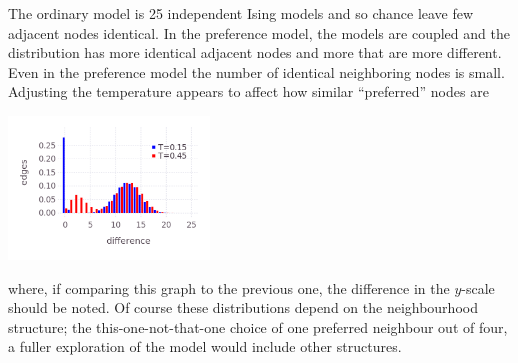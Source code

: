 \documentclass[letterpaper]{article}
\begin{document}
The ordinary model is 25 independent Ising models and so chance leave few adjacent nodes identical. In the preference model, the models are coupled and the distribution has more identical adjacent nodes and more that are more different. Even in the preference model the number of identical neighboring nodes is small. Adjusting the temperature appears to affect how similar ``preferred'' nodes are
\begin{center}
\includegraphics[height=1.5in]{l25t.png}
\end{center}
where, if comparing this graph to the previous one, the difference in
the $y$-scale should be noted. Of course these distributions depend on
the neighbourhood structure; the this-one-not-that-one choice of one
preferred neighbour out of four, a fuller exploration of the model
would include other structures.


 
\end{document}
